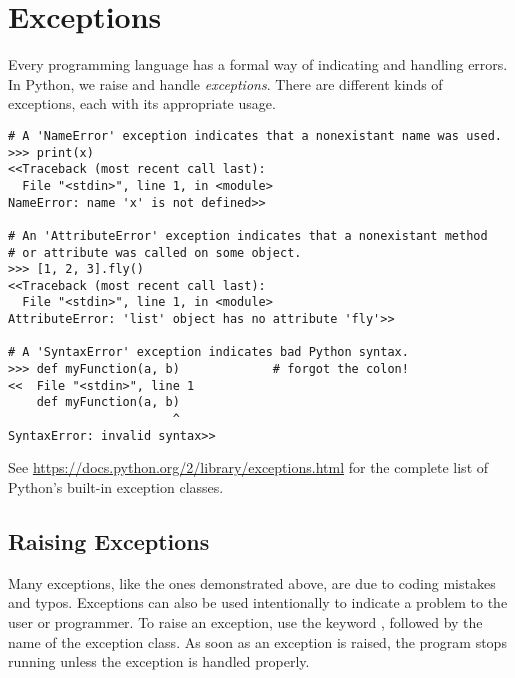 \label{lab:Exceptions}


\section*{Exceptions} %

Every programming language has a formal way of indicating and handling errors.
In Python, we raise and handle \emph{exceptions}.
There are different kinds of exceptions, each with its appropriate usage.

\begin{lstlisting}
# A 'NameError' exception indicates that a nonexistant name was used.
>>> print(x)
<<Traceback (most recent call last):
  File "<stdin>", line 1, in <module>
NameError: name 'x' is not defined>>

# An 'AttributeError' exception indicates that a nonexistant method
# or attribute was called on some object.
>>> [1, 2, 3].fly()
<<Traceback (most recent call last):
  File "<stdin>", line 1, in <module>
AttributeError: 'list' object has no attribute 'fly'>>

# A 'SyntaxError' exception indicates bad Python syntax.
>>> def myFunction(a, b)             # forgot the colon!
<<  File "<stdin>", line 1
    def myFunction(a, b)
                       ^
SyntaxError: invalid syntax>>
\end{lstlisting}

See \url{https://docs.python.org/2/library/exceptions.html} for the complete list of Python's built-in exception classes.

\subsection*{Raising Exceptions}

Many exceptions, like the ones demonstrated above, are due to coding mistakes and typos.
Exceptions can also be used intentionally to indicate a problem to the user or programmer.
To raise an exception, use the keyword , followed by the name of the exception class.
As soon as an exception is raised, the program stops running unless the exception is handled properly.

